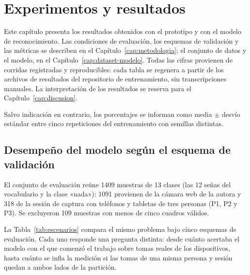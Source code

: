 \chapter{Experimentos y resultados}
\label{cap:resultados}

Este capítulo presenta los resultados obtenidos con el prototipo y con el modelo de reconocimiento. Las condiciones de evaluación, los esquemas de validación y las métricas se describen en el Capítulo~\ref{cap:metodologia}; el conjunto de datos y el modelo, en el Capítulo~\ref{cap:dataset-modelo}. Todas las cifras provienen de corridas registradas y reproducibles: cada tabla se regenera a partir de los archivos de resultados del repositorio de entrenamiento, sin transcripciones manuales. La interpretación de los resultados se reserva para el Capítulo~\ref{cap:discusion}.

Salvo indicación en contrario, los porcentajes se informan como media $\pm$ desvío estándar entre cinco repeticiones del entrenamiento con semillas distintas.

\section{Desempeño del modelo según el esquema de validación}
\label{sec:res-escenarios}

El conjunto de evaluación reúne 1409 muestras de 13 clases (las 12 señas del vocabulario y la clase «nada»): 1091 provienen de la cámara web de la autora y 318 de la sesión de captura con teléfonos y tabletas de tres personas (P1, P2 y P3). Se excluyeron 109 muestras con menos de cinco cuadros válidos.

La Tabla~\ref{tab:escenarios} compara el mismo problema bajo cinco esquemas de evaluación. Cada uno responde una pregunta distinta: desde cuánto acertaba el modelo con el que comenzó el trabajo sobre tomas reales de los dispositivos, hasta cuánto se infla la medición si las tomas de una misma persona y sesión quedan a ambos lados de la partición.

